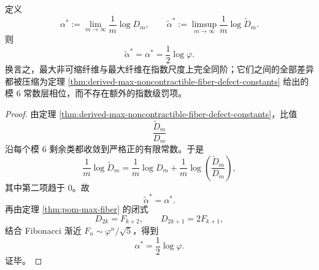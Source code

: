 \begin{corollary}[最大非可缩纤维在指数尺度上无额外罚项]\label{cor:derived-max-noncontractible-fiber-no-exponential-penalty}
定义
\[
\alpha^\ast:=\lim_{m\to\infty}\frac1m\log D_m,
\qquad
\widetilde\alpha^\ast:=\limsup_{m\to\infty}\frac1m\log \widetilde D_m.
\]
则
\[
\widetilde\alpha^\ast=\alpha^\ast=\frac12\log\varphi.
\]
换言之，最大非可缩纤维与最大纤维在指数尺度上完全同阶；它们之间的全部差异都被压缩为定理 \ref{thm:derived-max-noncontractible-fiber-defect-constants} 给出的模 \(6\) 常数层相位，而不存在额外的指数级罚项。
\end{corollary}
\begin{proof}
由定理 \ref{thm:derived-max-noncontractible-fiber-defect-constants}，比值
\[
\frac{\widetilde D_m}{D_m}
\]
沿每个模 \(6\) 剩余类都收敛到严格正的有限常数。于是
\[
\frac1m\log \widetilde D_m
=
\frac1m\log D_m+\frac1m\log\!\left(\frac{\widetilde D_m}{D_m}\right),
\]
其中第二项趋于 \(0\)。故
\[
\widetilde\alpha^\ast=\alpha^\ast.
\]
再由定理 \ref{thm:pom-max-fiber} 的闭式
\[
D_{2k}=F_{k+2},
\qquad
D_{2k+1}=2F_{k+1},
\]
结合 Fibonacci 渐近 \(F_n\sim \varphi^n/\sqrt5\)，得到
\[
\alpha^\ast=\frac12\log\varphi.
\]
证毕。
\end{proof}
